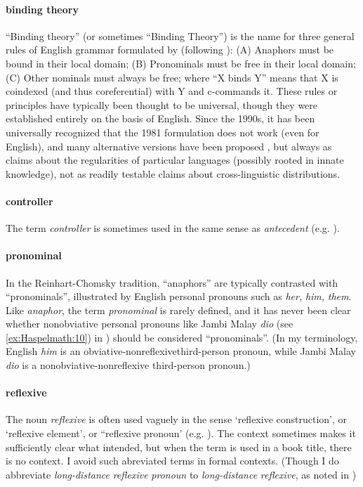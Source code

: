 \documentclass[output=paper]{langscibook}
\begin{document}
\paragraph*{binding theory} “Binding theory” (or sometimes “Binding Theory”) is the name for three general rules of English grammar formulated by \citet{Chomsky1981} (following \citealt{Reinhart1976,Reinhart1983a}): (A) Anaphors must be bound in their local domain; (B) Pronominals must be free in their local domain; (C) Other nominals must always be free; where “X binds Y” means that X is coindexed (and thus coreferential) with Y and c-commands it. These rules or principles have typically been thought to be universal, though they were established entirely on the basis of English. Since the 1990s, it has been universally recognized that the 1981 formulation does not work (even for English), and many alternative versions have been proposed \citep{Everaert2003}, but always as claims about the regularities of particular languages (possibly rooted in innate knowledge), not as readily testable claims about cross-linguistic distributions.

\paragraph*{controller} The term \textit{controller} is sometimes used in the same sense as \textit{antecedent} (e.g. \citealt{Dixon2012}).

\paragraph*{pronominal} In the Reinhart-Chomsky tradition, “anaphors” are typically contrasted with “pronominals”, illustrated by English personal pronouns such as \textit{her,} \textit{him,} \textit{them}. Like \textit{anaphor}, the term \textit{pronominal} is rarely defined, and it has never been clear whether nonobviative personal pronouns like Jambi Malay \textit{dio} (see \ref{ex:Haspelmath:10}) in ) should be considered “pronominals”. (In my terminology, English \textit{him} is an obviative-nonreflexivethird-person pronoun, while Jambi Malay \textit{dio} is a nonobviative-nonreflexive third-person pronoun.)

\paragraph*{reflexive} The noun \textit{reflexive} is often used vaguely in the sense ‘reflexive construction’, or ‘reflexive element’, or “reflexive pronoun’ (e.g. \citealt{Geniusiene1987, Frajzyngier1999, Kazenin2001, KoenigGast2008, DéchaineWiltschko2017a}). The context sometimes makes it sufficiently clear what intended, but when the term is used in a book title, there is no context. I avoid such abreviated terms in formal contexts. (Though I do abbreviate \textit{long-distance} \textit{reflexive} \textit{pronoun} to \textit{long-distance} \textit{reflexive}, as noted in )
\end{document}
